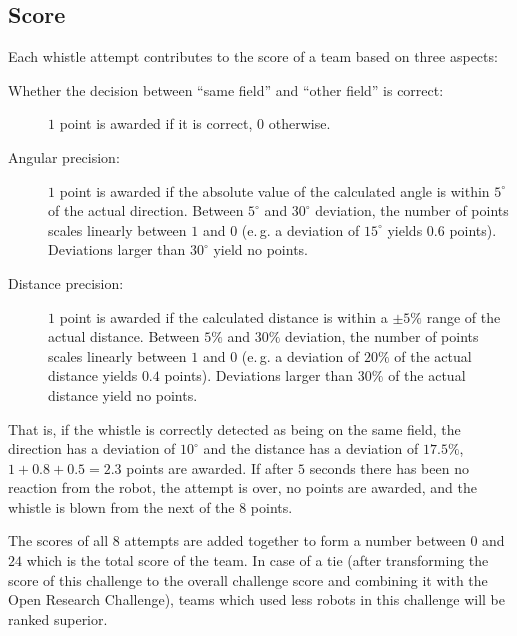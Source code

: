 \documentclass[12pt]{article}
\newcommand{\eg}{\mbox{e.\,g.}\xspace}
\begin{document}
\subsection{Score}
\label{sec:dwc:score}
Each whistle attempt contributes to the score of a team based on three aspects:
\begin{description}
\item[Whether the decision between ``same field'' and ``other field'' is correct:] \(1\) point is awarded if it is correct, \(0\) otherwise.
\item[Angular precision:] \(1\) point is awarded if the absolute value of the calculated angle is within \(5^\circ\) of the actual direction. Between \(5^\circ\) and \(30^\circ\) deviation, the number of points scales linearly between \(1\) and \(0\) (\eg a deviation of \(15^\circ\) yields \(0.6\) points). Deviations larger than \(30^\circ\) yield no points.
\item[Distance precision:] \(1\) point is awarded if the calculated distance is within a \(\pm5\%\) range of the actual distance. Between \(5\%\) and \(30\%\) deviation, the number of points scales linearly between \(1\) and \(0\) (\eg a deviation of \(20\%\) of the actual distance yields \(0.4\) points). Deviations larger than \(30\%\) of the actual distance yield no points.
\end{description}
That is, if the whistle is correctly detected as being on the same field, the direction has a deviation of \(10^\circ\) and the distance has a deviation of \(17.5\%\), \(1+0.8+0.5=2.3\) points are awarded. If after \(5\) seconds there has been no reaction from the robot, the attempt is over, no points are awarded, and the whistle is blown from the next of the \(8\) points.

The scores of all \(8\) attempts are added together to form a number between \(0\) and \(24\) which is the total score of the team. In case of a tie (after transforming the score of this challenge to the overall challenge score and combining it with the Open Research Challenge), teams which used less robots in this challenge will be ranked superior.
\end{document}
